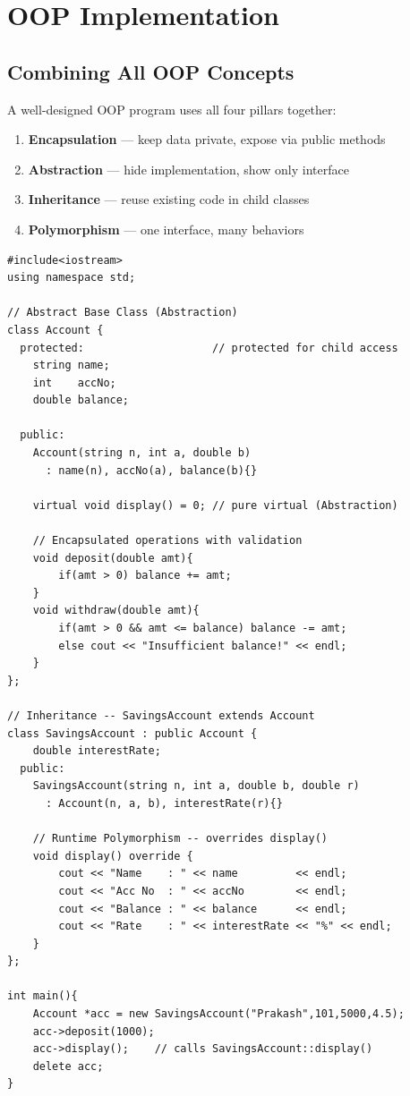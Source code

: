 \documentclass[12pt,a4paper]{report}
\begin{document}
\chapter{OOP Implementation}

\section{Combining All OOP Concepts}

A well-designed OOP program uses all four pillars together:

\begin{enumerate}[leftmargin=*]
  \item \textbf{Encapsulation} --- keep data private, expose via public methods
  \item \textbf{Abstraction} --- hide implementation, show only interface
  \item \textbf{Inheritance} --- reuse existing code in child classes
  \item \textbf{Polymorphism} --- one interface, many behaviors
\end{enumerate}

\begin{lstlisting}[caption={Mini Bank System -- all OOP concepts}]
#include<iostream>
using namespace std;

// Abstract Base Class (Abstraction)
class Account {
  protected:                    // protected for child access
    string name;
    int    accNo;
    double balance;

  public:
    Account(string n, int a, double b)
      : name(n), accNo(a), balance(b){}

    virtual void display() = 0; // pure virtual (Abstraction)

    // Encapsulated operations with validation
    void deposit(double amt){
        if(amt > 0) balance += amt;
    }
    void withdraw(double amt){
        if(amt > 0 && amt <= balance) balance -= amt;
        else cout << "Insufficient balance!" << endl;
    }
};

// Inheritance -- SavingsAccount extends Account
class SavingsAccount : public Account {
    double interestRate;
  public:
    SavingsAccount(string n, int a, double b, double r)
      : Account(n, a, b), interestRate(r){}

    // Runtime Polymorphism -- overrides display()
    void display() override {
        cout << "Name    : " << name         << endl;
        cout << "Acc No  : " << accNo        << endl;
        cout << "Balance : " << balance      << endl;
        cout << "Rate    : " << interestRate << "%" << endl;
    }
};

int main(){
    Account *acc = new SavingsAccount("Prakash",101,5000,4.5);
    acc->deposit(1000);
    acc->display();    // calls SavingsAccount::display()
    delete acc;
}
\end{lstlisting}
\end{document}
